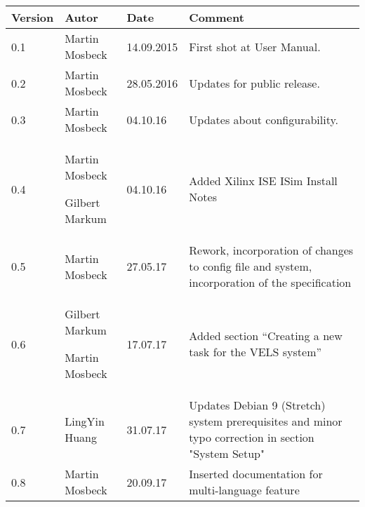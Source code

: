 
\begin{table}[h]
\begin{tabular*}{14.7cm}{|p{}|p{}|p{2cm}|p{}|}
\hline 
Version & Autor & Date & Comment \\[2pt]
\hline
\hline
0.1 & Martin Mosbeck & 14.09.2015 & First shot at User Manual. \\[2pt]
\hline 
0.2 & Martin Mosbeck & 28.05.2016 & Updates for public release. \\[2pt]
\hline 
0.3 & Martin Mosbeck & 04.10.16 & Updates about configurability. \\[2pt]
\hline 
0.4 & Martin Mosbeck \par Gilbert Markum & 04.10.16 & Added Xilinx ISE ISim Install Notes \\[2pt]
\hline 
0.5 & Martin Mosbeck & 27.05.17 & Rework, incorporation of changes to config file and system, incorporation of the 
specification \\[2pt]
\hline
0.6 & Gilbert Markum \par Martin Mosbeck & 17.07.17 & Added section ``Creating a new task for the VELS system'' \\[2pt]
\hline
0.7 & LingYin Huang & 31.07.17 & Updates Debian 9 (Stretch) system prerequisites and minor typo correction in section "System Setup" \\[2pt]
\hline
0.8 & Martin Mosbeck & 20.09.17 & Inserted documentation for multi-language feature \\[2pt]
\hline
\end{tabular*}
\end{table}


